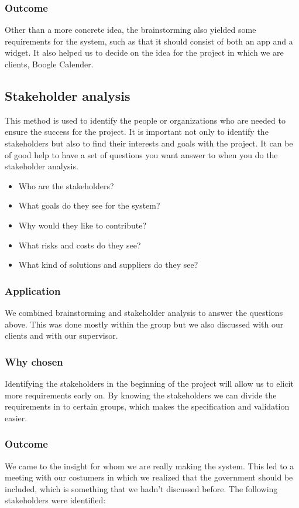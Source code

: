 \documentclass[a4paper]{article}
\begin{document}
		\subsubsection{Outcome}
		Other than a more concrete idea, the brainstorming also yielded some requirements for the system, such as that it should consist of both an app and a widget. It also helped us to decide on the idea for the project in which we are clients, Boogle Calender.

		\subsection{Stakeholder analysis}
 This method is used to identify the people or organizations who are needed to ensure the success for the project. It is important not only to identify the stakeholders but also to find their interests and goals with the project. It can be of good help to have a set of questions you want answer to when you do the stakeholder analysis.

		\begin{itemize}
			\item Who are the stakeholders?
			\item What goals do they see for the system?
			\item Why would they like to contribute?
			\item What risks and costs do they see?
			\item What kind of solutions and suppliers do they see?
		\end{itemize}
		
		\subsubsection{Application}
 We combined brainstorming and stakeholder analysis to answer the questions above. This was done mostly within the group but we also discussed with our clients and with our supervisor.
		\subsubsection{Why chosen}
		Identifying the stakeholders in the beginning of the project will allow us to elicit more requirements early on. By knowing the stakeholders we can divide the requirements in to certain groups, which makes the specification and validation easier.
		\subsubsection{Outcome}
We came to the insight for whom we are really making the system. This led to a meeting with our costumers in which we realized that the government should be included, which is something that we hadn’t discussed before.
	The following stakeholders were identified:
\end{document}
